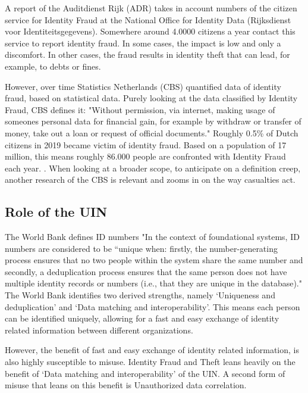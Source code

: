 A report of the Auditdienst Rijk (ADR)\cite{ADR} takes in account numbers of the citizen service for Identity Fraud at the National Office for Identity Data (Rijksdienst voor Identiteitsgegevens). Somewhere around 4.0000 citizens a year contact this service to report identity fraud. In some cases, the impact is low and only a discomfort. In other cases, the fraud results in identity theft that can lead, for example, to debts or fines.\par

However, over time Statistics Netherlands (CBS) quantified data of identity fraud, based on statistical data. Purely looking at the data classified by Identity Fraud, CBS defines it: "Without permission, via internet, making usage of someones personal data for financial gain, for example by withdraw or transfer of money, take out a loan or request of official documents." Roughly 0.5\% of Dutch citizens in 2019 became victim of identity fraud. Based on a population of 17 million, this means roughly 86.000 people are confronted with Identity Fraud each year. 
.
When looking at a broader scope, to anticipate on a definition creep, another research of the CBS is relevant {\cite{CBS_casualtiesDigitalCrime}} and zooms in on the way casualties act.

\subsection{Role of the UIN}
The World Bank \cite{WorldBank_UIN} defines ID numbers "In the context of foundational systems, ID numbers are considered to be “unique when: firstly, the number-generating process ensures that no two people within the system share the same number and secondly, a deduplication process ensures that the same person does not have multiple identity records or numbers (i.e., that they are unique in the database)." The World Bank identifies two derived strengths, namely ‘Uniqueness and deduplication’ and ‘Data matching and interoperability’. This means each person can be identified uniquely, allowing for a fast and easy exchange of identity related information between different organizations.\par 
However, the benefit of fast and easy exchange of identity related information, is also highly susceptible to misuse. Identity Fraud and Theft leans heavily on the benefit of ‘Data matching and interoperability’ of the UIN. A second form of misuse that leans on this benefit is Unauthorized data correlation. \par

